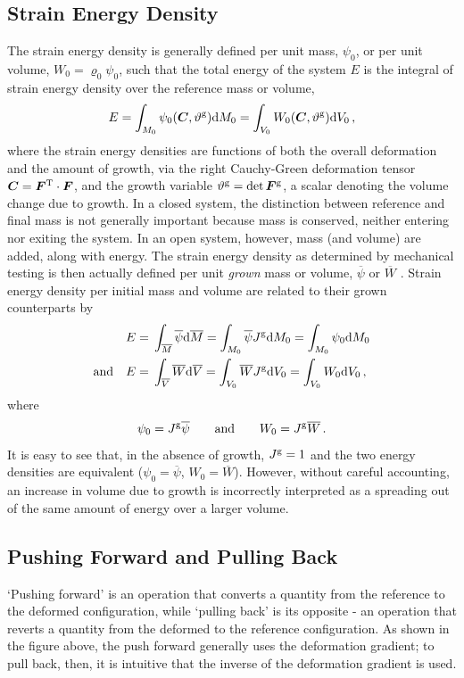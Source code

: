 \documentclass[10pt,letterpaper,oneside]{report}
\newcommand{\sca}[1]{\mbox{\rm{#1}}{}} %
\newcommand{\ten}[1]{\mbox{\boldmath $#1$}{}}
\newcommand{\scas}[1]{\mbox{{\scriptsize{${\rm{#1}}$}}}{}}
\begin{document}
\begin{itemize}
\subsection{Strain Energy Density}
The strain energy density is generally defined per unit mass, $\psi_0$, or per unit volume, $W_0 = \varrho_0 \psi_0$, such that the total energy of the system $E$ is the integral of strain energy density over the reference mass or volume, 
\begin{equation}
E = \int_{M_0} \psi_0 ( \ten{C}, \vartheta^{\scas{g}} ) \sca{d}M_0 = \int_{V_0} W_0 ( \ten{C}, \vartheta^{\scas{g}} ) \sca{d}V_0 \, , 
\end{equation}
where the strain energy densities are functions of both the overall deformation and the amount of growth, via 
the right Cauchy-Green deformation tensor $\ten{C} = \ten{F}^{\scas{T}} \cdot \ten{F}$, and
the growth variable $\vartheta^{\scas{g}} = \det \ten{F}^{\scas{g}}$, a scalar denoting the volume change due to growth.  
In a closed system, the distinction between reference and final mass is not generally important because mass is conserved, neither entering nor exiting the system.  In an open system, however, mass (and volume) are added, along with energy.  The strain energy density as determined by mechanical testing is then actually defined per unit \textit{grown} mass or volume, $\overline{\psi}$ or $\overline{W}$ \cite{Ganghoffer2013}.  Strain energy density per initial mass and volume are related to their grown counterparts by 
\begin{align}
E ={}& \int_{\overline{M}} \overline{\psi} \sca{d}\overline{M} = \int_{M_0} \overline{\psi} J^{\scas{g}} \sca{d}M_0 = \int_{M_0} \psi_0 \sca{d}M_0 
\\ \mbox{and} \quad 
E ={}& \int_{\overline{V}} \overline{W} \sca{d}\overline{V} = \int_{V_0} \overline{W} J^{\scas{g}} \sca{d}V_0 = \int_{V_0} W_0 \sca{d}V_0 \, , 
\end{align}
where 
\begin{equation}
\psi_0 = J^{\scas{g}} \overline{\psi} \qquad \mbox{and} \qquad W_0 = J^{\scas{g}} \overline{W} \, . 
\end{equation}
It is easy to see that, in the absence of growth, $J^{\scas{g}} = 1$ and the two energy densities are equivalent ($\psi_0 = \overline{\psi}$, $W_0 = \overline{W}$).  However, without careful accounting, an increase in volume due to growth is incorrectly interpreted as a spreading out of the same amount of energy over a larger volume. 


\subsection{Pushing Forward and Pulling Back}
`Pushing forward' is an operation that converts a quantity from the reference to the deformed configuration, while `pulling back' is its opposite - an operation that reverts a quantity from the deformed to the reference configuration.  As shown in the figure above, the push forward generally uses the deformation gradient; to pull back, then, it is intuitive that the inverse of the deformation gradient is used.  


\end{itemize}
\end{document}
